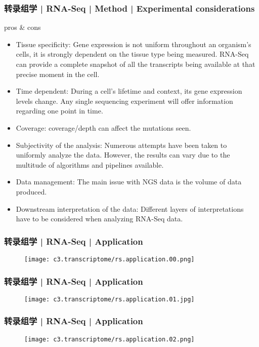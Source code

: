 \begin{frame}
  \frametitle{转录组学 | RNA-Seq | Method | Experimental considerations}
  {\footnotesize
  \begin{block}{pros \& cons}
    \begin{itemize}
      \item Tissue specificity: Gene expression is not uniform throughout an organism's cells, it is strongly dependent on the tissue type being measured. RNA-Seq can provide a complete snapshot of all the transcripts being available at that precise moment in the cell.
      \item Time dependent: During a cell's lifetime and context, its gene expression levels change. Any single sequencing experiment will offer information regarding one point in time.
      \item Coverage: coverage/depth can affect the mutations seen.
      \item Subjectivity of the analysis: Numerous attempts have been taken to uniformly analyze the data. However, the results can vary due to the multitude of algorithms and pipelines available.
      \item Data management: The main issue with NGS data is the volume of data produced.
      \item Downstream interpretation of the data: Different layers of interpretations have to be considered when analyzing RNA-Seq data.
    \end{itemize}
  \end{block}
  }
\end{frame}

\begin{frame}
  \frametitle{转录组学 | RNA-Seq | Application}
  \begin{figure}
    \centering
    \texttt{[image: c3.transcriptome/rs.application.00.png]}
  \end{figure}
\end{frame}

\begin{frame}
  \frametitle{转录组学 | RNA-Seq | Application}
  \begin{figure}
    \centering
    \texttt{[image: c3.transcriptome/rs.application.01.jpg]}
  \end{figure}
\end{frame}

\begin{frame}
  \frametitle{转录组学 | RNA-Seq | Application}
  \begin{figure}
    \centering
    \texttt{[image: c3.transcriptome/rs.application.02.png]}
  \end{figure}
\end{frame}

